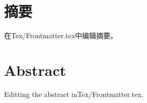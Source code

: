 
\intobmk\chapter*{摘\quad 要}%
\setcounter{page}{1}%
在Tex/Frontmatter.tex中编辑摘要。


\intobmk\chapter*{Abstract}%
Editting the abstract inTex/Frontmatter.tex.

